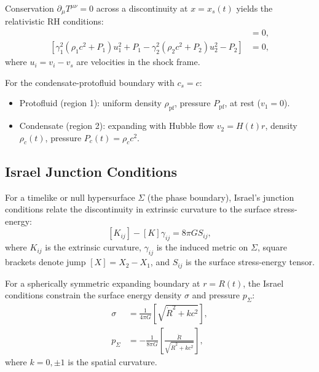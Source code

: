 \documentclass[11pt,a4paper]{article}
\theoremstyle{definition}
\theoremstyle{remark}
\begin{document}
Conservation $\partial_\mu T^{\mu\nu} = 0$ across a discontinuity at $x = x_s(t)$ yields the relativistic RH conditions:
\begin{align}
[\gamma_1(\rho_1 c^2 + P_1)u_1 - \gamma_2(\rho_2 c^2 + P_2)u_2] &= 0, \label{eq:rh_rel_energy} \\
[\gamma_1^2(\rho_1 c^2 + P_1)u_1^2 + P_1 - \gamma_2^2(\rho_2 c^2 + P_2)u_2^2 - P_2] &= 0, \label{eq:rh_rel_momentum}
\end{align}
where $u_i = v_i - v_s$ are velocities in the shock frame.

For the condensate-protofluid boundary with $c_s = c$:
\begin{itemize}[leftmargin=*, itemsep=0.2em]
\item Protofluid (region 1): uniform density $\rho_{\mathrm{pf}}$, pressure $P_{\mathrm{pf}}$, at rest ($v_1 = 0$).
\item Condensate (region 2): expanding with Hubble flow $v_2 = H(t)r$, density $\rho_c(t)$, pressure $P_c(t) = \rho_c c^2$.
\end{itemize}

\subsection{Israel Junction Conditions}
\label{sec:israel_junction}

For a timelike or null hypersurface $\Sigma$ (the phase boundary), Israel's junction conditions \cite{Israel1966} relate the discontinuity in extrinsic curvature to the surface stress-energy:
\begin{equation}
\label{eq:israel_junction}
[K_{ij}] - [K]\gamma_{ij} = 8\pi G S_{ij},
\end{equation}
where $K_{ij}$ is the extrinsic curvature, $\gamma_{ij}$ is the induced metric on $\Sigma$, square brackets denote jump $[X] = X_2 - X_1$, and $S_{ij}$ is the surface stress-energy tensor.

For a spherically symmetric expanding boundary at $r = R(t)$, the Israel conditions constrain the surface energy density $\sigma$ and pressure $p_\Sigma$:
\begin{align}
\sigma &= \frac{1}{4\pi G}\left[\sqrt{\dot{R}^2 + k c^2}\right], \label{eq:surface_energy} \\
p_\Sigma &= -\frac{1}{8\pi G}\left[\frac{\ddot{R}}{\sqrt{\dot{R}^2 + k c^2}}\right], \label{eq:surface_pressure}
\end{align}
where $k = 0, \pm 1$ is the spatial curvature.
\end{document}
